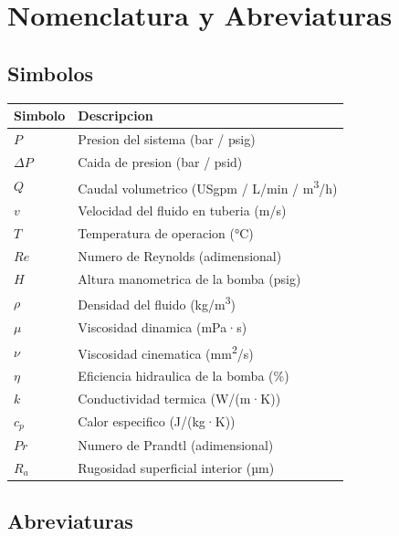 \section*{Nomenclatura y Abreviaturas}

\subsection*{Simbolos}

\begin{tabularx}{\textwidth}{@{}l>{\raggedright\arraybackslash}X@{}}
	\toprule
	\textbf{Simbolo} & \textbf{Descripcion} \\
	\midrule
	$P$ & Presion del sistema (bar / psig) \\
	$\Delta P$ & Caida de presion (bar / psid) \\
	$Q$ & Caudal volumetrico (USgpm / L/min / m\textsuperscript{3}/h) \\
	$v$ & Velocidad del fluido en tuberia (m/s) \\
	$T$ & Temperatura de operacion (°C) \\
	$Re$ & Numero de Reynolds (adimensional) \\
	$H$ & Altura manometrica de la bomba (psig) \\
	$\rho$ & Densidad del fluido (kg/m\textsuperscript{3}) \\
	$\mu$ & Viscosidad dinamica (mPa·s) \\
	$\nu$ & Viscosidad cinematica (mm\textsuperscript{2}/s) \\
	$\eta$ & Eficiencia hidraulica de la bomba (\%) \\
	$k$ & Conductividad termica (W/(m·K)) \\
	$c_p$ & Calor especifico (J/(kg·K)) \\
	$Pr$ & Numero de Prandtl (adimensional) \\
	$R_a$ & Rugosidad superficial interior (µm) \\
	\bottomrule
\end{tabularx}

\vspace{1cm}

\subsection*{Abreviaturas}

